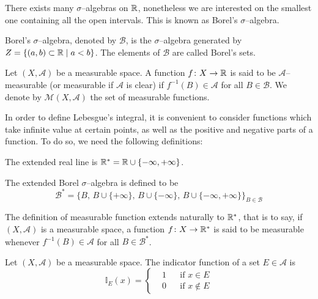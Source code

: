 There exists many $\sigma$--algebras on $\mathbb{R}$, nonetheless we are interested
on the smallest one containing all the open intervals. This is known as Borel's
$\sigma$--algebra.

\begin{definition*}
	Borel's $\sigma$--algebra, denoted by $\mathcal{B}$, is the
	$\sigma$--algebra generated by $Z = \{ (a,b) \subset \mathbb{R} \mid a < b \}$.
	The elements of $\mathcal{B}$ are called Borel's sets.
\end{definition*}

\begin{definition*}
	Let $(X, \mathcal{A})$ be a measurable space. A function $f \colon X \to
	\mathbb{R}$ is said to be $\mathcal{A}$--measurable (or measurable if
	$\mathcal{A}$ is clear) if $f^{-1}(B) \in \mathcal{A}$ for all $B \in
	\mathcal{B}$. We denote by $\mathcal{M}(X, \mathcal{A})$ the set of
	measurable functions.
\end{definition*}

In order to define Lebesgue's integral, it is convenient to consider functions
which take infinite value at certain points, as well as the positive and
negative parts of a function. To do so, we need the following definitions:

\begin{definition*}
	\begin{enumeratedef}
		\item[]
		\item The extended real line is $\mathbb{R}^\ast = \mathbb{R} \cup \{-\infty, +\infty\}$.
		\item The extended Borel $\sigma$--algebra is defined to be
		\[
			\mathcal{B}^\ast = \{
			B, \, B \cup \{ + \infty \}, \, B \cup \{ - \infty \}, \, B \cup \{ -\infty, +\infty \}	
			\}_{B \in \mathcal{B}}
		\]
	\end{enumeratedef}
\end{definition*}

The definition of measurable function extends naturally to $\mathbb{R}^\ast$, that is
to say, if $(X, \mathcal{A})$ is a measurable space, a function $f \colon X
\rightarrow \mathbb{R}^\ast$ is said to be measurable whenever $f^{-1}(B) \in \mathcal{A}$
for all $B \in \mathcal{B}^\ast$.

\begin{definition*}
	Let $(X, \mathcal{A})$ be a measurable space. The indicator function of a
	set $E \in \mathcal{A}$ is 
	\[
		\mathbb{I}_E(x) = 
		\left\{
			\begin{aligned}
				&1	& &\text{if } x \in E 		\\
				&0	& &\text{if } x \not\in E
			\end{aligned}
		\right.
	\] 
\end{definition*}

